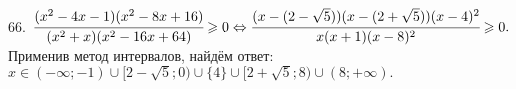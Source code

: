 66. $\cfrac{(x^2-4x-1)(x^2-8x+16)}{(x^2+x)(x^2-16x+64)}\geqslant0\Leftrightarrow
\cfrac{(x-(2-\sqrt{5}))(x-(2+\sqrt{5}))(x-4)^2}{x(x+1)(x-8)^2}\geqslant0.$ Применив метод интервалов, найдём ответ: $x\in
(-\infty;-1)\cup[2-\sqrt{5};0)\cup\{4\}\cup[2+\sqrt{5};8)\cup(8;+\infty).$
\begin{figure}[ht!]
\end{figure}\\
